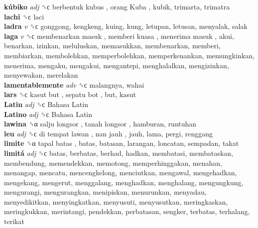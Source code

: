 \textbf{kúbiko} \emph{adj}  ␝ϲ   berbentuk kubus ,  orang Kuba , kubik, trimarta, trimatra  \\
\textbf{lachi} ␝ϲ  laci  \\
\textbf{ladra} \emph{v}  ␝ϲ  gonggong, kengkeng, kuing, kung, letupan, letusan, menyalak, salak  \\
\textbf{laga} \emph{v}  ␝ϲ   membenarkan masuk ,  memberi kuasa ,  menerima masuk , akui, benarkan, izinkan, meluluskan, memasukkan, membenarkan, memberi, membiarkan, membolehkan, memperbolehkan, memperkenankan, memungkinkan, menerima, mengaku, mengakui, mengantepi, menghalalkan, mengizinkan, menyewakan, merelakan  \\
\textbf{lamentablemente} \emph{adv}  ␝ϲ  malangnya, wahai  \\
\textbf{lars} ␝ϲ   kasut but ,  sepatu bot , but, kasut  \\
\textbf{Latin} \emph{adj}  ␝ϲ   Bahasa Latin   \\
\textbf{Latino} \emph{adj}  ␝ϲ   Bahasa Latin   \\
\textbf{lawina} ␝α   salju longsor ,  tanah longsor , hamburan, runtuhan  \\
\textbf{leu} \emph{adj}  ␝ϲ   di tempat lawan ,  nan jauh , jauh, lama, pergi, renggang  \\
\textbf{limite} ␝α   tapal batas , batas, batasan, larangan, loncatan, sempadan, takat  \\
\textbf{limitá} \emph{adj}  ␝ϲ  batas, berbatas, berhad, hadkan, membatasi, membataskan, membendung, memendekkan, memotong, memperhinggakan, menahan, menangap, mencatu, mencengkelong, menciutkan, mengawal, mengehadkan, mengekang, mengerut, menggalang, menghadkan, menghalang, mengungkung, mengurangi, mengurangkan, menipiskan, menurunkan, menyadau, menyedikitkan, menyingkatkan, menyusuti, menyusutkan, meringkaskan, meringkukkan, merintangi, pendekkan, perbatasan, sengker, terbatas, terhalang, terikat  \\
